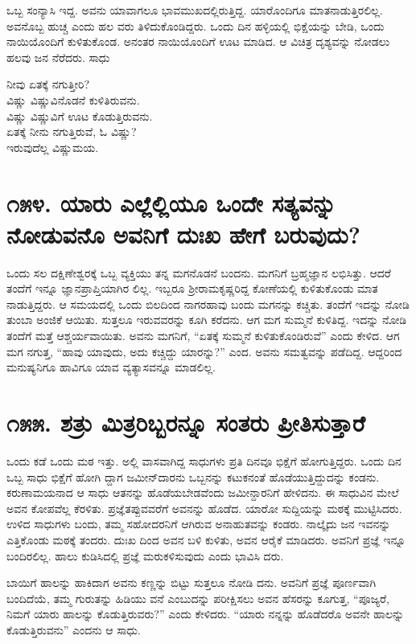 ಒಬ್ಬ ಸಂನ್ಯಾಸಿ ಇದ್ದ. ಅವನು ಯಾವಾಗಲೂ ಭಾವಮುಖದಲ್ಲಿರುತ್ತಿದ್ದ. ಯಾರೊಂದಿಗೂ ಮಾತನಾಡುತ್ತಿರಲಿಲ್ಲ. ಅವನೊಬ್ಬ ಹುಚ್ಚ ಎಂದು ಹಲ ವರು ತಿಳಿದುಕೊಂಡಿದ್ದರು. ಒಂದು ದಿನ ಹಳ್ಳಿಯಲ್ಲಿ ಭಿಕ್ಷೆಯನ್ನು ಬೇಡಿ, ಒಂದು ನಾಯಿಯೊಂದಿಗೆ ಕುಳಿತುಕೊಂಡ. ಅನಂತರ ನಾಯಿಯೊಂದಿಗೆ ಊಟ ಮಾಡಿದ. ಆ ವಿಚಿತ್ರ ದೃಶ್ಯವನ್ನು ನೋಡಲು ಹಲವು ಜನ ನೆರೆದರು. ಸಾಧು


\begin{myquote}
ನೀವು ಏತಕ್ಕೆ ನಗುತ್ತೀರಿ?\\ವಿಷ್ಣು ವಿಷ್ಣುವಿನೊಡನೆ ಕುಳಿತಿರುವನು.\\ವಿಷ್ಣು ವಿಷ್ಣುವಿಗೆ ಊಟ ಕೊಡುತ್ತಿರುವನು.\\ ಏತಕ್ಕೆ ನೀನು ನಗುತ್ತಿರುವೆ, ಓ ವಿಷ್ಣು?\\ಇರುವುದೆಲ್ಲ ವಿಷ್ಣುಮಯ.
\end{myquote}


\section{\num{೧೫೪. } ಯಾರು ಎಲ್ಲೆಲ್ಲಿಯೂ ಒಂದೇ ಸತ್ಯವನ್ನು ನೋಡುವನೊ ಅವನಿಗೆ ದುಃಖ ಹೇಗೆ ಬರುವುದು?}

ಒಂದು ಸಲ ದಕ್ಷಿಣೇಶ್ವರಕ್ಕೆ ಒಬ್ಬ ವ್ಯಕ್ತಿಯು ತನ್ನ ಮಗನೊಡನೆ ಬಂದನು. ಮಗನಿಗೆ ಬ್ರಹ್ಮಜ್ಞಾನ ಲಭಿಸಿತ್ತು. ಆದರೆ ತಂದೆಗೆ ಇನ್ನೂ ಜ್ಞಾನಪ್ರಾಪ್ತಿಯಾಗಿರ ಲಿಲ್ಲ. ಇಬ್ಬರೂ ಶ್ರೀರಾಮಕೃಷ್ಣರಿದ್ದ ಕೋಣೆಯಲ್ಲಿ ಕುಳಿತುಕೊಂಡು ಮಾತ ನಾಡುತ್ತಿದ್ದರು. ಆ ಸಮಯದಲ್ಲಿ ಒಂದು ಬಿಲದಿಂದ ನಾಗರಹಾವು ಬಂದು ಮಗನನ್ನು ಕಚ್ಚಿತು. ತಂದೆಗೆ ಇದನ್ನು ನೋಡಿ ತುಂಬಾ ಅಂಜಿಕೆ ಆಯಿತು. ಸುತ್ತಲೂ ಇರುವವರನ್ನು ಕೂಗಿ ಕರೆದನು. ಆಗ ಮಗ ಸುಮ್ಮನೆ ಕುಳಿತಿದ್ದ. ಇದನ್ನು ನೋಡಿ ತಂದೆಗೆ ಮತ್ತೆ ಆಶ್ಚರ್ಯವಾಯಿತು. ಅವನು ಮಗನಿಗೆ, “ಏತಕ್ಕೆ ಸುಮ್ಮನೆ ಕುಳಿತುಕೊಂಡಿರುವೆ” ಎಂದು ಕೇಳಿದ. ಆಗ ಮಗ ನಗುತ್ತ, “ಹಾವು ಯಾವುದು, ಅದು ಕಚ್ಚಿದ್ದು ಯಾರನ್ನು?” ಎಂದ. ಅವನು ಸಮತ್ವವನ್ನು ಪಡೆದಿದ್ದ. ಆದ್ದರಿಂದ ಮನುಷ್ಯನಿಗೂ ಹಾವಿಗೂ ಯಾವ ವ್ಯತ್ಯಾಸವನ್ನೂ ಮಾಡಲಿಲ್ಲ.


\section{\num{೧೫೫. } ಶತ್ರು ಮಿತ್ರರಿಬ್ಬರನ್ನೂ ಸಂತರು ಪ್ರೀತಿಸುತ್ತಾರೆ}

ಒಂದು ಕಡೆ ಒಂದು ಮಠ ಇತ್ತು. ಅಲ್ಲಿ ವಾಸವಾಗಿದ್ದ ಸಾಧುಗಳು ಪ್ರತಿ ದಿನವೂ ಭಿಕ್ಷೆಗೆ ಹೋಗುತ್ತಿದ್ದರು. ಒಂದು ದಿನ ಒಬ್ಬ ಸಾಧು ಭಿಕ್ಷೆಗೆ ಹೋಗಿ ದ್ದಾಗ ಜಮೀನ್​ದಾರನು ಒಬ್ಬನನ್ನು ಕಟುಕನಂತೆ ಹೊಡೆಯುತ್ತಿದ್ದುದನ್ನು ಕಂಡನು. ಕರುಣಾಮಯನಾದ ಆ ಸಾಧು ಆತನನ್ನು ಹೊಡೆಯಬೇಡವೆಂದು ಜಮೀನ್ದಾರನಿಗೆ ಹೇಳಿದನು. ಈ ಸಾಧುವಿನ ಮೇಲೆ ಅವನ ಕೋಪವೆಲ್ಲ ಕೆರಳಿತು. ಪ್ರಜ್ಞೆತಪ್ಪುವವರೆಗೆ ಅವನನ್ನು ಹೊಡೆದ. ಯಾರೋ ಸುದ್ದಿಯನ್ನು ಮಠಕ್ಕೆ ಮುಟ್ಟಿಸಿದರು. ಉಳಿದ ಸಾಧುಗಳು ಬಂದು, ತಮ್ಮ ಸಹೋದರನಿಗೆ ಆಗಿರುವ ಅನಾಹುತವನ್ನು ಕಂಡರು. ನಾಲ್ಕೈದು ಜನ ಇವನನ್ನು ಎತ್ತಿಕೊಂಡು ಮಠಕ್ಕೆ ತಂದರು. ದುಃಖ ದಿಂದ ಅವನ ಬಳಿ ಕುಳಿತು, ಅವನ ಆರೈಕೆ ಮಾಡಿದರು. ಅವನಿಗೆ ಪ್ರಜ್ಞೆ ಇನ್ನೂ ಬಂದಿರಲಿಲ್ಲ. ಹಾಲು ಕುಡಿಸಿದಲ್ಲಿ ಪ್ರಜ್ಞೆ ಮರುಕಳಿಸುವುದು ಎಂದು ಭಾವಿಸಿ ದರು.

ಬಾಯಿಗೆ ಹಾಲನ್ನು ಹಾಕಿದಾಗ ಅವನು ಕಣ್ಣನ್ನು ಬಿಟ್ಟು ಸುತ್ತಲೂ ನೋಡಿ ದನು. ಅವನಿಗೆ ಪ್ರಜ್ಞೆ ಪೂರ್ಣವಾಗಿ ಬಂದಿದೆಯೆ, ತಮ್ಮ ಗುರುತನ್ನು ಹಿಡಿಯು ವನೆ ಎಂಬುದನ್ನು ಪರೀಕ್ಷಿಸಲು ಅವನ ಹೆಸರನ್ನು ಕೂಗುತ್ತ, “ಪೂಜ್ಯರೆ, ನಿಮಗೆ ಯಾರು ಹಾಲನ್ನು ಕೊಡುತ್ತಿರುವರು?” ಎಂದು ಕೇಳಿದರು. “ಯಾರು ನನ್ನನ್ನು ಹೊಡೆದರೊ ಅವನೇ ಹಾಲನ್ನು ಕೊಡುತ್ತಿರುವನು” ಎಂದನು ಆ ಸಾಧು.



